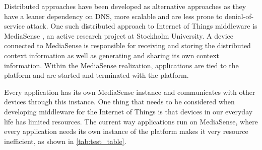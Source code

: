 Distributed approaches have been developed as alternative approaches as they have a leaner dependency on DNS, more scalable and are less prone to denial-of-service attack. One such distributed approach to Internet of Things middleware is MediaSense \cite{Kanter539187}, an active research project at Stockholm University. A device connected to MediaSense is responsible for receiving and storing the distributed context information as well as generating and sharing its own context information. Within the MediaSense realization, applications are tied to the platform and are started and terminated with the platform. 

Every application has its own MediaSense instance and communicates with other devices through this instance. One thing that needs to be considered when developing middleware for the  Internet of Things is that devices in our everyday life has limited resources. The current way applications run on MediaSense, where every application needs its own instance of the platform makes it very resource inefficient, as shown in \ref{tab:test_table}.

